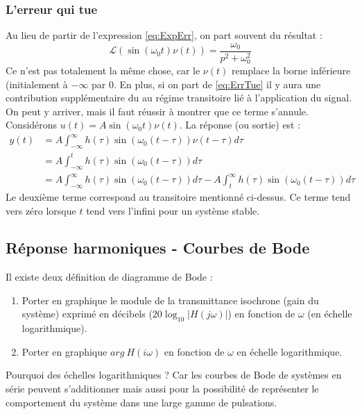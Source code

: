 		\subsubsection{L'erreur qui tue}
		Au lieu de partir de l'expression \autoref{eq:ExpErr}, on part souvent du résultat : 
		\begin{equation}
		\mathcal{L}(\sin(\omega_0t)\nu(t)) = \frac{\omega_0}{p^2+\omega_0^2}
		\label{eq:ErrTue}
		\end{equation}
		Ce n'est pas totalement la même chose, car le $\nu(t)$ remplace la borne inférieure 
		(initialement à $-\infty$ par 0. En plus, si on part de \autoref{eq:ErrTue} il y 
		aura une contribution supplémentaire du au régime transitoire lié à l'application du
		signal. On peut y arriver, mais il faut réussir à montrer que ce terme s'annule.\\
		Considérons $u(t) = A\sin(\omega_0t)\nu(t)$. La réponse (ou sortie) est :
		\begin{equation}
		\begin{array}{ll}
		y(t) &= A\int_{-\infty}^\infty h(\tau)\sin(\omega_0(t-\tau))\nu(t-\tau)d\tau\\
		 &= A\int_{-\infty}^t h(\tau)\sin(\omega_0(t-\tau))d\tau \\
		 &= A\int_{-\infty}^\infty h(\tau)\sin(\omega_0(t-\tau))d\tau - A\int_{t}^\infty
		 h(\tau)\sin(\omega_0(t-\tau))d\tau
		\end{array}
		\end{equation}
		Le deuxième terme correspond au transitoire mentionné ci-dessus. Ce terme tend vers
		zéro lorsque $t$ tend vers l'infini pour un système stable.


	
	\subsection{Réponse harmoniques - Courbes de Bode}
	Il existe deux définition de diagramme de Bode :
	\begin{enumerate}
	\item Porter en graphique le module de la transmittance isochrone (gain du système) exprimé 
	en décibels ($20\log_10|H(j\omega)|$) en fonction de $\omega$ (en échelle logarithmique).
	\item Porter en graphique $arg\ H(i\omega)$ en fonction de $\omega$ en échelle logarithmique.
	\end{enumerate}
	Pourquoi des échelles logarithmiques ? Car les courbes de Bode de systèmes en série peuvent 
	s'additionner mais aussi pour la possibilité de représenter le comportement du système dans 
	une large gamme de pulsations.\\
	
